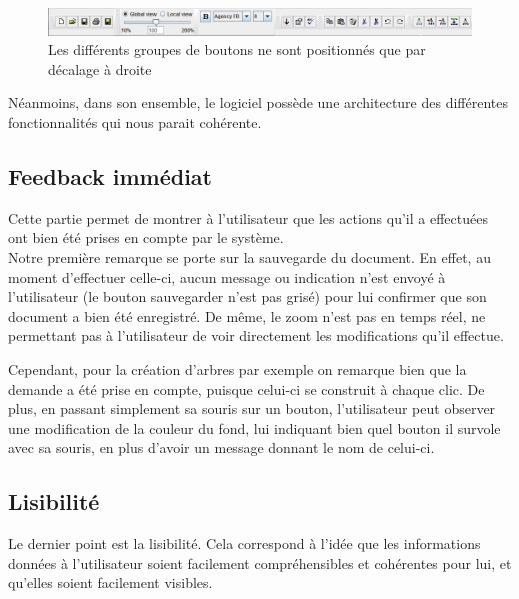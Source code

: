 \documentclass[12pt, a4paper]{article}
\begin{document}
\begin{figure}[h]
\begin{center}
   \includegraphics[scale = 0.5]{agencement.jpg}
	\caption{Les différents groupes de boutons ne sont positionnés que par décalage à droite}
	\end{center}
\end{figure}


Néanmoins, dans son ensemble, le logiciel possède une architecture des différentes fonctionnalités qui nous parait cohérente.  

\textcolor{NavyBlue}{\subsection{Feedback immédiat}}
Cette partie permet de montrer à l'utilisateur que les actions qu'il a effectuées ont bien été prises en compte par le système.\\


Notre première remarque se porte sur la sauvegarde du document. En effet, au moment d'effectuer celle-ci, aucun message ou indication n'est envoyé à l'utilisateur (le bouton sauvegarder n'est pas grisé) pour lui confirmer que son document a bien été enregistré. De même, le zoom n'est pas en temps réel, ne permettant pas à l'utilisateur de voir directement les modifications qu'il effectue. 


Cependant, pour la création d'arbres par exemple on remarque bien que la demande a été prise en compte, puisque celui-ci se construit à chaque clic. De plus, en passant simplement sa souris sur un bouton, l'utilisateur peut observer une modification de la couleur du fond, lui indiquant bien quel bouton il survole avec sa souris, en plus d'avoir un message donnant le nom de celui-ci.
\newpage
\textcolor{NavyBlue}{\subsection{Lisibilité}}
Le dernier point est la lisibilité. Cela correspond à l'idée que les informations données à l’utilisateur soient facilement compréhensibles et cohérentes pour lui, et qu'elles soient facilement visibles.
\end{document}
